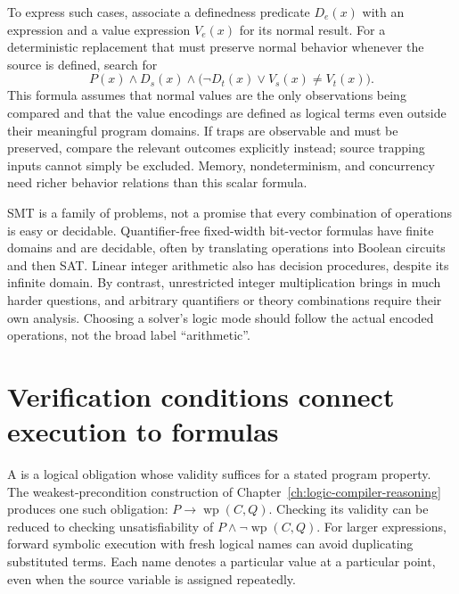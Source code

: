 To express such cases, associate a definedness predicate $D_e(x)$ with an expression and a value expression $V_e(x)$ for its normal result.
For a deterministic replacement that must preserve normal behavior whenever the source is defined, search for
\[
 P(x)\land D_s(x)\land
 \bigl(\neg D_t(x)\lor V_s(x)\neq V_t(x)\bigr).
\]
This formula assumes that normal values are the only observations being compared and that the value encodings are defined as logical terms even outside their meaningful program domains.
If traps are observable and must be preserved, compare the relevant outcomes explicitly instead; source trapping inputs cannot simply be excluded.
Memory, nondeterminism, and concurrency need richer behavior relations than this scalar formula.

SMT is a family of problems, not a promise that every combination of operations is easy or decidable.
Quantifier-free fixed-width bit-vector formulas have finite domains and are decidable, often by translating operations into Boolean circuits and then SAT.
Linear integer arithmetic also has decision procedures, despite its infinite domain.
By contrast, unrestricted integer multiplication brings in much harder questions, and arbitrary quantifiers or theory combinations require their own analysis.
Choosing a solver's logic mode should follow the actual encoded operations, not the broad label \enquote{arithmetic}.

\section{Verification conditions connect execution to formulas}
\label{sec:ch41-vcs}

A  is a logical obligation whose validity suffices for a stated program property.
The weakest-precondition construction of Chapter~\ref{ch:logic-compiler-reasoning} produces one such obligation: $P\rightarrow\operatorname{wp}(C,Q)$.
Checking its validity can be reduced to checking unsatisfiability of $P\land\neg\operatorname{wp}(C,Q)$.
For larger expressions, forward symbolic execution with fresh logical names can avoid duplicating substituted terms.
Each name denotes a particular value at a particular point, even when the source variable is assigned repeatedly.

